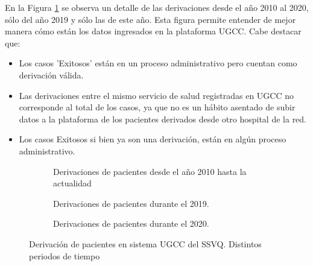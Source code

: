 \documentclass{article}
\begin{document}





En la Figura \ref{fig: ARBOL derivacionesUGCC} se observa un detalle de las derivaciones desde el año 2010 al 2020, sólo del año 2019 y sólo las de este año. Esta figura permite entender de mejor manera cómo están los datos ingresados en la plataforma UGCC. Cabe destacar que:

\begin{itemize}
	\item Los casos 'Exitosos' están en un proceso administrativo pero cuentan como derivación válida.
	\item Las derivaciones entre el mismo servicio de salud registradas en UGCC no corresponde al total de los casos, ya que no es un hábito asentado de subir datos a la plataforma de los pacientes derivados desde otro hospital de la red.
	\item Los casos Exitosos si bien ya son una derivación, están en algún proceso administrativo.
\end{itemize}
 


\begin{figure}[h]
	\centering
	\begin{subfigure}{.75\textwidth}
		\centering
		\resizebox{.999\textwidth}{!}{
		\begin{tikzpicture}
		[-,thick,
		every node/.style={shape=rectangle,inner sep=3pt,draw,thick, align=center}]
		\footnotesize
		;
		\end{tikzpicture}
		}
		\caption{Derivaciones de pacientes desde el año 2010 hasta la actualidad }
	\end{subfigure}%

	\begin{subfigure}{.75\textwidth}
		\centering
		\resizebox{.999\textwidth}{!}{
		\begin{tikzpicture}
		[-,thick,%
		every node/.style={shape=rectangle,inner sep=3pt,draw,thick, align=center}]
		\footnotesize
		;
		\end{tikzpicture}
		}
		\caption{Derivaciones de pacientes durante el 2019.}
	\end{subfigure}
	\begin{subfigure}{.75\textwidth}
	\centering
	\resizebox{.999\textwidth}{!}{
		\begin{tikzpicture}
		[-,thick,%
		every node/.style={shape=rectangle,inner sep=3pt,draw,thick, align=center}]
		\footnotesize
		;
		\end{tikzpicture}
	}
	\caption{Derivaciones de pacientes durante el 2020.}
	\end{subfigure}
	\caption{Derivación de pacientes en sistema UGCC del SSVQ. Distintos periodos de tiempo}
	\label{fig: ARBOL derivacionesUGCC}
\end{figure}
\end{document}
